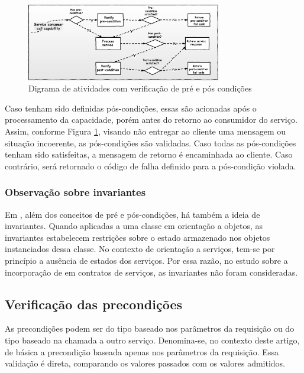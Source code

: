 \begin{figure}[!htb]
\centering
\includegraphics[width=85mm,trim = 0mm 0mm 0mm
0mm,clip]{img/FluxoDbcCondicoes.pdf} 
\caption{Digrama de atividades com verificação de pré e pós condições}
\label{FigServiceDbC}
\end{figure}

Caso tenham sido definidas pós-condições, essas são acionadas após o
processamento da capacidade, porém antes do retorno ao consumidor do serviço.
Assim, conforme Figura \ref{FigServiceDbC}, visando não entregar ao cliente uma
mensagem ou situação incoerente, as pós-condições são validadas. Caso todas as
pós-condições tenham sido satisfeitas, a mensagem de retorno é encaminhada ao
cliente. Caso contrário, será retornado o código de falha definido para a
pós-condição violada.

\subsubsection{Observação sobre invariantes}


Em \designbycontract{}, além dos conceitos de pré e pós-condições,
há também a ideia de invariantes\cite{meyer1997object}. Quando aplicadas a uma
classe em orientação a objetos, as invariantes estabelecem restrições sobre o
estado armazenado nos objetos instanciados dessa classe. No contexto de orientação a
serviços, tem-se por princípio a ausência de estados dos serviços. Por essa razão, 
no estudo sobre a incorporação de
\designbycontract{} em contratos de serviços, as invariantes não foram
consideradas.


\subsection{Verificação das precondições}


As precondições podem ser do tipo baseado nos parâmetros da requisição ou do
tipo baseado na chamada a outro serviço. Denomina-se, no contexto deste artigo,
de básica a precondição baseada apenas nos parâmetros da requisição. Essa validação é direta,
comparando os valores passados com os valores admitidos. 

